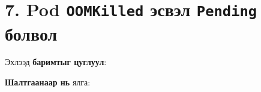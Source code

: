 \hypertarget{pod-oomkilled-ux44dux441ux432ux44dux43b-pending-ux431ux43eux43bux432ux43eux43b}{%
\section{\texorpdfstring{7. Pod \texttt{OOMKilled} эсвэл \texttt{Pending} болвол}{7. Pod OOMKilled эсвэл Pending болвол}}\label{pod-oomkilled-ux44dux441ux432ux44dux43b-pending-ux431ux43eux43bux432ux43eux43b}}

Эхлээд \textbf{баримтыг цуглуул}:

\begin{Shaded}
\begin{Highlighting}[]
\OperatorTok{\textless{}}\OperatorTok{\textgreater{}} \KeywordTok{|} 
\KeywordTok{|} 
\KeywordTok{|} 
\OperatorTok{\textgreater{}}
\end{Highlighting}
\end{Shaded}

\textbf{Шалтгаанаар нь} ялга:

